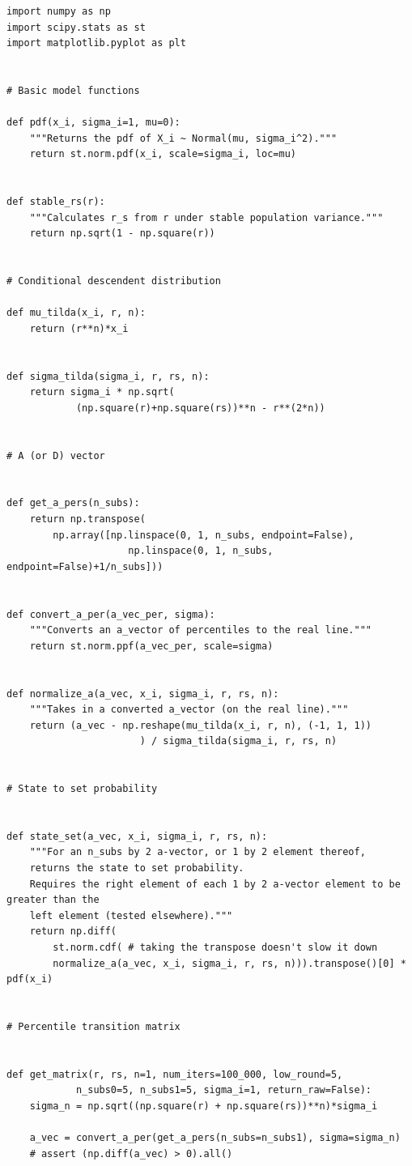 \documentclass[a4paper,11pt]{article} %
\begin{document}
\begin{verbatim}
import numpy as np
import scipy.stats as st
import matplotlib.pyplot as plt


# Basic model functions

def pdf(x_i, sigma_i=1, mu=0):
    """Returns the pdf of X_i ~ Normal(mu, sigma_i^2)."""
    return st.norm.pdf(x_i, scale=sigma_i, loc=mu)


def stable_rs(r):
    """Calculates r_s from r under stable population variance."""
    return np.sqrt(1 - np.square(r))


# Conditional descendent distribution

def mu_tilda(x_i, r, n):
    return (r**n)*x_i


def sigma_tilda(sigma_i, r, rs, n):
    return sigma_i * np.sqrt(
            (np.square(r)+np.square(rs))**n - r**(2*n))


# A (or D) vector


def get_a_pers(n_subs):
    return np.transpose(
        np.array([np.linspace(0, 1, n_subs, endpoint=False),
                     np.linspace(0, 1, n_subs, endpoint=False)+1/n_subs]))


def convert_a_per(a_vec_per, sigma):
    """Converts an a_vector of percentiles to the real line."""
    return st.norm.ppf(a_vec_per, scale=sigma)


def normalize_a(a_vec, x_i, sigma_i, r, rs, n):
    """Takes in a converted a_vector (on the real line)."""
    return (a_vec - np.reshape(mu_tilda(x_i, r, n), (-1, 1, 1))
                       ) / sigma_tilda(sigma_i, r, rs, n)


# State to set probability


def state_set(a_vec, x_i, sigma_i, r, rs, n):
    """For an n_subs by 2 a-vector, or 1 by 2 element thereof,
    returns the state to set probability.
    Requires the right element of each 1 by 2 a-vector element to be greater than the
    left element (tested elsewhere)."""
    return np.diff(
        st.norm.cdf( # taking the transpose doesn't slow it down
        normalize_a(a_vec, x_i, sigma_i, r, rs, n))).transpose()[0] * pdf(x_i)


# Percentile transition matrix


def get_matrix(r, rs, n=1, num_iters=100_000, low_round=5, 
			n_subs0=5, n_subs1=5, sigma_i=1, return_raw=False):
    sigma_n = np.sqrt((np.square(r) + np.square(rs))**n)*sigma_i

    a_vec = convert_a_per(get_a_pers(n_subs=n_subs1), sigma=sigma_n)
    # assert (np.diff(a_vec) > 0).all()


\end{verbatim}
\end{document}
